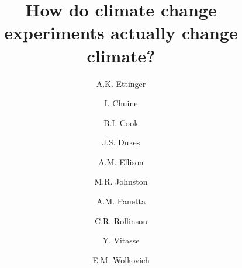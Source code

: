 \documentclass{article}
\begin{document}


\title{How do climate change experiments actually change climate?} 

\author[1,2,a]{A.K. Ettinger}

\author[3,b]{I. Chuine}

\author[4,5,c]{B.I. Cook}

\author[6,d]{J.S. Dukes}

\author[7,e]{A.M. Ellison}

\author[8,f]{M.R. Johnston}

\author[9,g]{A.M. Panetta}


\author[10,h]{C.R. Rollinson}

\author[11,12,i]{Y. Vitasse}

\author[1,8,j]{E.M. Wolkovich}











\end{document}
